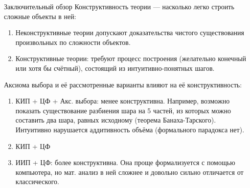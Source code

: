 \documentclass[aspectratio=169]{beamer}
\begin{document}
\begin{frame}{Заключительный обзор}
Конструктивность теории --- насколько легко строить сложные объекты в ней:
\begin{enumerate}
\item Неконструктивные теории допускают доказательства чистого существования произвольных по сложности объектов.
\item Конструктивные теории: требуют процесс построения (желательно конечный или хотя бы счётный), 
состоящий из интуитивно-понятных шагов.
\end{enumerate}

Аксиома выбора и её рассмотренные варианты влияют на её конструктивность:
\begin{enumerate}
\item КИП + ЦФ + Акс. выбора: менее конструктивна.
Например, возможно показать существование разбиения шара на 5 частей, из которых можно составить два шара,
равных исходному (теорема Банаха-Тарского).
Интуитивно нарушается аддитивность объёма (формального парадокса нет).

\item КИП + ЦФ
\item ИИП + ЦФ: более конструктивна. Она проще формализуется с помощью компьютера, но мат. анализ в ней сложнее и довольно сильно отличается от классического.
\end{enumerate}
\end{frame}
\end{document}
